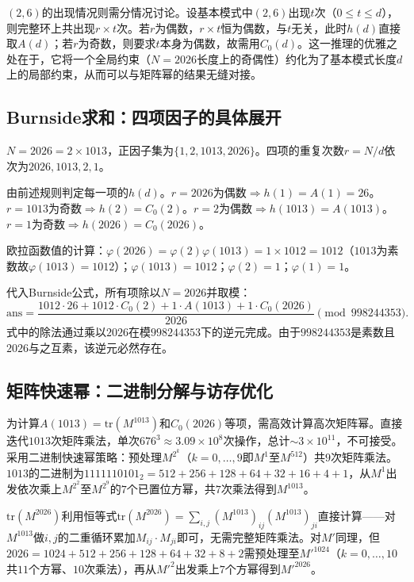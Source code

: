$(2,6)$的出现情况则需分情况讨论。设基本模式中$(2,6)$出现$t$次（$0\le t\le d$），则完整环上共出现$r\times t$次。若$r$为偶数，$r\times t$恒为偶数，与$t$无关，此时$h(d)$直接取$A(d)$；若$r$为奇数，则要求$t$本身为偶数，故需用$C_0(d)$。这一推理的优雅之处在于，它将一个全局约束（$N=2026$长度上的奇偶性）约化为了基本模式长度$d$上的局部约束，从而可以与矩阵幂的结果无缝对接。

\subsection{Burnside求和：四项因子的具体展开}

$N=2026=2\times 1013$，正因子集为$\{1,2,1013,2026\}$。四项的重复次数$r=N/d$依次为$2026,1013,2,1$。

由前述规则判定每一项的$h(d)$。$r=2026$为偶数$\Rightarrow h(1)=A(1)=26$。$r=1013$为奇数$\Rightarrow h(2)=C_0(2)$。$r=2$为偶数$\Rightarrow h(1013)=A(1013)$。$r=1$为奇数$\Rightarrow h(2026)=C_0(2026)$。

欧拉函数值的计算：$\varphi(2026)=\varphi(2)\varphi(1013)=1\times 1012=1012$（$1013$为素数故$\varphi(1013)=1012$）；$\varphi(1013)=1012$；$\varphi(2)=1$；$\varphi(1)=1$。

代入Burnside公式，所有项除以$N=2026$并取模：
\[
\mathrm{ans}=\frac{1012\cdot 26+1012\cdot C_0(2)+1\cdot A(1013)+1\cdot C_0(2026)}{2026}\pmod{998244353}.
\]
式中的除法通过乘以$2026$在模$998244353$下的逆元完成。由于$998244353$是素数且$2026$与之互素，该逆元必然存在。

\subsection{矩阵快速幂：二进制分解与访存优化}

为计算$A(1013)=\mathrm{tr}(M^{1013})$和$C_0(2026)$等项，需高效计算高次矩阵幂。直接迭代$1013$次矩阵乘法，单次$676^3\approx 3.09\times 10^8$次操作，总计$\sim 3\times 10^{11}$，不可接受。采用二进制快速幂策略：预处理$M^{2^k}$（$k=0,\dots,9$即$M^1$至$M^{512}$）共$9$次矩阵乘法。$1013$的二进制为$1111110101_2=512+256+128+64+32+16+4+1$，从$M^1$出发依次乘上$M^{2^2}$至$M^{2^9}$的$7$个已置位方幂，共$7$次乘法得到$M^{1013}$。

$\mathrm{tr}(M^{2026})$利用恒等式$\mathrm{tr}(M^{2026})=\sum_{i,j}(M^{1013})_{ij}(M^{1013})_{ji}$直接计算——对$M^{1013}$做$i,j$的二重循环累加$M_{ij}\cdot M_{ji}$即可，无需完整矩阵乘法。对$M'$同理，但$2026=1024+512+256+128+64+32+8+2$需预处理至$M'^{1024}$（$k=0,\dots,10$共$11$个方幂、$10$次乘法），再从$M'^2$出发乘上$7$个方幂得到$M'^{2026}$。

